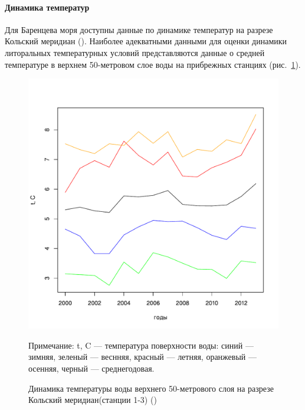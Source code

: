 		\paragraph{Динамика температур}
Для Баренцева моря доступны данные по динамике температур на разрезе Кольский меридиан (\cite{pinro}). 
Наиболее адекватными данными для оценки динамики литоральных температурных условий представляются данные о средней температуре в верхнем 50-метровом слое воды на прибрежных станциях (рис.~\ref{ris:Barents_temp_dynamic}).
	\begin{figure}
    \includegraphics[width=\textwidth]{../Barenc_Sea/temperature/t_air_mean_season_year1.pdf}
    \caption{Динамика температуры воды верхнего 50-метрового слоя на разрезе Кольский меридиан(станции 1-3) (\cite{pinro})}

{\footnotesize Примечание: t, C --- температура поверхности воды: синий --- зимняя, зеленый --- веснняя, красный --- летняя, оранжевый --- осенняя, черный --- среднегодовая. }
    \label{ris:Barents_temp_dynamic}
	\end{figure}


\vspace{2cm}

